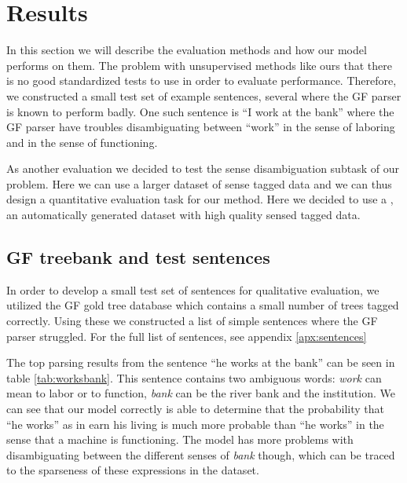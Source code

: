 \chapter{Results}

In this section we will describe the evaluation methods and how our model performs on them.
The problem with unsupervised methods like ours that there is no good standardized tests to use in order to evaluate performance. Therefore, we constructed a small test set of example sentences, several where the GF parser is known to perform badly. One such sentence is ``I work at the bank'' where the GF parser have troubles disambiguating between ``work'' in the sense of laboring and in the sense of functioning.

As another evaluation we decided to test the sense disambiguation subtask of our problem. Here we can use a larger dataset of sense tagged data and we can thus design a quantitative evaluation task for our method. Here we decided to use a  \citep{pasini2017trainomatic}, an automatically generated dataset with high quality sensed tagged data.


\section{GF treebank and test sentences}
In order to develop a small test set of sentences for qualitative evaluation, we utilized the GF gold tree database which contains a small number of trees tagged correctly. Using these we constructed a list of simple sentences where the GF parser struggled. For the full list of sentences, see appendix \ref{apx:sentences}

The top parsing results from the sentence ``he works at the bank'' can be seen in table \ref{tab:worksbank}. This sentence contains two ambiguous words: \emph{work} can mean to labor or to function, \emph{bank} can be the river bank and the institution. We can see that our model correctly is able to determine that the probability that ``he works'' as in earn his living is much more probable than ``he works'' in the sense that a machine is functioning. The model has more problems with disambiguating between the different senses of \emph{bank} though, which can be traced to the sparseness of these expressions in the dataset.


